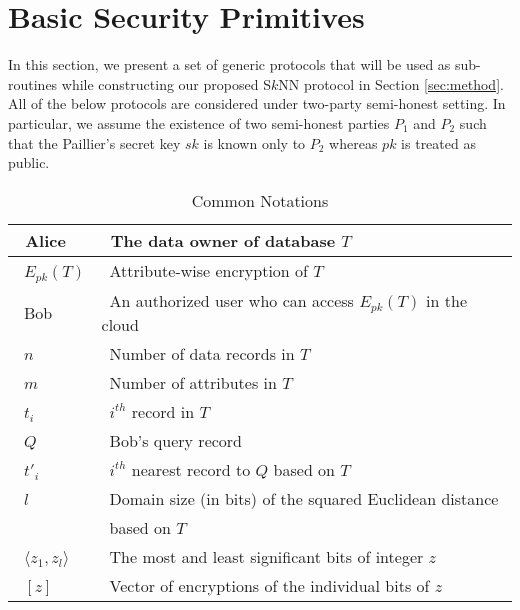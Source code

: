 \documentclass{article}
\begin{document}
\section{ Basic Security Primitives}\label{sec:sub-methods}
In this section, we present a set of generic protocols that will be used 
as sub-routines while constructing our proposed S$k$NN protocol in Section \ref{sec:method}. All of 
the below protocols are considered under two-party semi-honest setting. In particular, 
we assume the existence of two semi-honest parties $P_1$ and $P_2$ such that the 
Paillier's secret key $sk$ is known only to $P_2$ whereas $pk$ is treated as public. 
\begin{table}[t]
\caption{Common Notations}
\centering
\renewcommand{\arraystretch}{1.3}
\begin{tabular}{| l | l |}
\hline
~Alice & ~The data owner of database $T$\\
\hline
~$E_{pk}(T)$ & ~Attribute-wise encryption of $T$ \\ 
\hline
~Bob & ~An authorized user who can access $E_{pk}(T)$ in the cloud \\
\hline
~$n$ & ~Number of data records in $T$\\
\hline
~$m$ & ~Number of attributes in $T$ \\
\hline
~$t_i$ & ~$i^{th}$ record in $T$ \\
\hline
~$Q$ & ~Bob's query record \\
\hline
~$t'_i$ & ~$i^{th}$ nearest record to $Q$ based on $T$\\
\hline
~$l$ & ~Domain size (in bits) of the squared Euclidean distance\\
& ~based on $T$ \\
\hline
~$\langle z_1, z_{l}\rangle$ & ~The most and least significant bits of integer $z$\\
\hline
~$[z]$ & ~Vector of encryptions of the individual bits of $z$\\
\hline 
\end{tabular}
\label{tb:notations}
\end{table}
  
\end{document}
